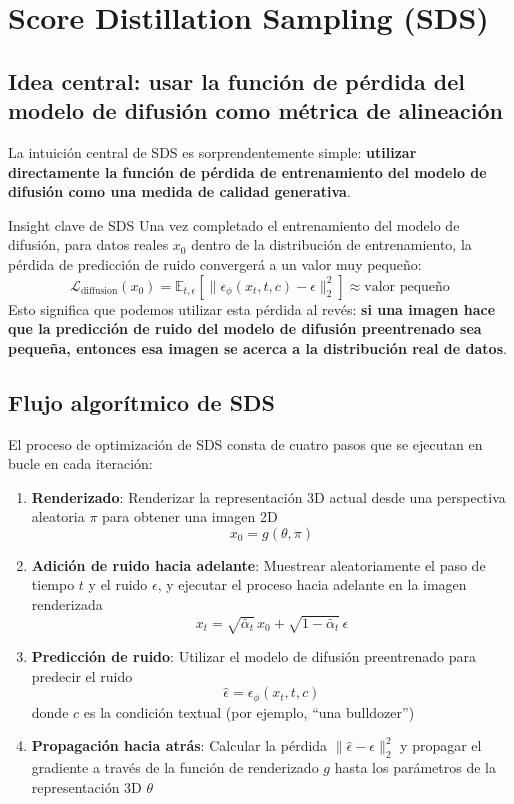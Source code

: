 \section{Score Distillation Sampling (SDS)}

\subsection{Idea central: usar la función de pérdida del modelo de difusión como métrica de alineación}

La intuición central de SDS es sorprendentemente simple: \textbf{utilizar directamente la función de pérdida de entrenamiento del modelo de difusión como una medida de calidad generativa}.

\begin{importantbox}{Insight clave de SDS}
Una vez completado el entrenamiento del modelo de difusión, para datos reales $x_0$ dentro de la distribución de entrenamiento, la pérdida de predicción de ruido convergerá a un valor muy pequeño:
$$
\mathcal{L}_{\text{diffusion}}(x_0) = \mathbb{E}_{t, \epsilon}\left[\| \epsilon_\phi(x_t, t, c) - \epsilon \|_2^2\right] \approx \text{valor pequeño}
$$
Esto significa que podemos utilizar esta pérdida al revés: \textbf{si una imagen hace que la predicción de ruido del modelo de difusión preentrenado sea pequeña, entonces esa imagen se acerca a la distribución real de datos}.
\end{importantbox}

\subsection{Flujo algorítmico de SDS}

El proceso de optimización de SDS consta de cuatro pasos que se ejecutan en bucle en cada iteración:

\begin{enumerate}
    \item \textbf{Renderizado}: Renderizar la representación 3D actual desde una perspectiva aleatoria $\pi$ para obtener una imagen 2D
    $$x_0 = g(\theta, \pi)$$

    \item \textbf{Adición de ruido hacia adelante}: Muestrear aleatoriamente el paso de tiempo $t$ y el ruido $\epsilon$, y ejecutar el proceso hacia adelante en la imagen renderizada
    $$x_t = \sqrt{\bar{\alpha}_t}\, x_0 + \sqrt{1 - \bar{\alpha}_t}\, \epsilon$$

    \item \textbf{Predicción de ruido}: Utilizar el modelo de difusión preentrenado para predecir el ruido
    $$\hat{\epsilon} = \epsilon_\phi(x_t, t, c)$$
    donde $c$ es la condición textual (por ejemplo, ``una bulldozer'')

    \item \textbf{Propagación hacia atrás}: Calcular la pérdida $\| \hat{\epsilon} - \epsilon \|_2^2$ y propagar el gradiente a través de la función de renderizado $g$ hasta los parámetros de la representación 3D $\theta$
\end{enumerate}

